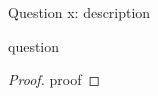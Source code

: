 \begin{solution}{Question x: description}\label{ques:x}
    \begin{question}
    question
    \end{question}
    \tcblower{}
    \begin{proof}
    proof
    \end{proof}
\end{solution}
 
